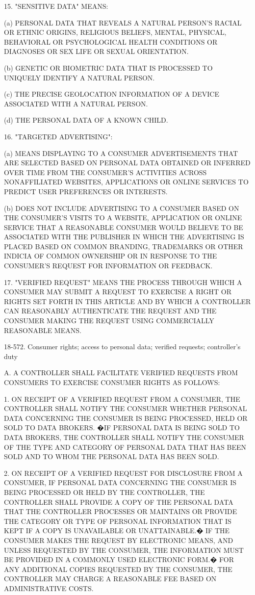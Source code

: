 15. "SENSITIVE DATA" MEANS:

(a) PERSONAL DATA THAT REVEALS A NATURAL PERSON'S RACIAL OR ETHNIC ORIGINS, RELIGIOUS BELIEFS, MENTAL, PHYSICAL, BEHAVIORAL OR PSYCHOLOGICAL HEALTH CONDITIONS OR DIAGNOSES OR SEX LIFE OR SEXUAL ORIENTATION.

(b) GENETIC OR BIOMETRIC DATA THAT IS PROCESSED TO UNIQUELY IDENTIFY A NATURAL PERSON.

(c) THE PRECISE GEOLOCATION INFORMATION OF A DEVICE ASSOCIATED WITH A NATURAL PERSON.

(d) THE PERSONAL DATA OF A KNOWN CHILD.

16. "TARGETED ADVERTISING":

(a) MEANS DISPLAYING TO A CONSUMER ADVERTISEMENTS THAT ARE SELECTED BASED ON PERSONAL DATA OBTAINED OR INFERRED OVER TIME FROM THE CONSUMER'S ACTIVITIES ACROSS NONAFFILIATED WEBSITES, APPLICATIONS OR ONLINE SERVICES TO PREDICT USER PREFERENCES OR INTERESTS.

(b) DOES NOT INCLUDE ADVERTISING TO A CONSUMER BASED ON THE CONSUMER'S VISITS TO A WEBSITE, APPLICATION OR ONLINE SERVICE THAT A REASONABLE CONSUMER WOULD BELIEVE TO BE ASSOCIATED WITH THE PUBLISHER IN WHICH THE ADVERTISING IS PLACED BASED ON COMMON BRANDING, TRADEMARKS OR OTHER INDICIA OF COMMON OWNERSHIP OR IN RESPONSE TO THE CONSUMER'S REQUEST FOR INFORMATION OR FEEDBACK.

17. "VERIFIED REQUEST" MEANS THE PROCESS THROUGH WHICH A CONSUMER MAY SUBMIT A REQUEST TO EXERCISE A RIGHT OR RIGHTS SET FORTH IN THIS ARTICLE AND BY WHICH A CONTROLLER CAN REASONABLY AUTHENTICATE THE REQUEST AND THE CONSUMER MAKING THE REQUEST USING COMMERCIALLY REASONABLE MEANS.

18-572. Consumer rights; access to personal data; verified requests; controller's duty

A. A CONTROLLER SHALL FACILITATE VERIFIED REQUESTS FROM CONSUMERS TO EXERCISE CONSUMER RIGHTS AS FOLLOWS:

1. ON RECEIPT OF A VERIFIED REQUEST FROM A CONSUMER, THE CONTROLLER SHALL NOTIFY THE CONSUMER WHETHER PERSONAL DATA CONCERNING THE CONSUMER IS BEING PROCESSED, HELD OR SOLD TO DATA BROKERS. �IF PERSONAL DATA IS BEING SOLD TO DATA BROKERS, THE CONTROLLER SHALL NOTIFY THE CONSUMER OF THE TYPE AND CATEGORY OF PERSONAL DATA THAT HAS BEEN SOLD AND TO WHOM THE PERSONAL DATA HAS BEEN SOLD.

2. ON RECEIPT OF A VERIFIED REQUEST FOR DISCLOSURE FROM A CONSUMER, IF PERSONAL DATA CONCERNING THE CONSUMER IS BEING PROCESSED OR HELD BY THE CONTROLLER, THE CONTROLLER SHALL PROVIDE A COPY OF THE PERSONAL DATA THAT THE CONTROLLER PROCESSES OR MAINTAINS OR PROVIDE THE CATEGORY OR TYPE OF PERSONAL INFORMATION THAT IS KEPT IF A COPY IS UNAVAILABLE OR UNATTAINABLE.� IF THE CONSUMER MAKES THE REQUEST BY ELECTRONIC MEANS, AND UNLESS REQUESTED BY THE CONSUMER, THE INFORMATION MUST BE PROVIDED IN A COMMONLY USED ELECTRONIC FORM.� FOR ANY ADDITIONAL COPIES REQUESTED BY THE CONSUMER, THE CONTROLLER MAY CHARGE A REASONABLE FEE BASED ON ADMINISTRATIVE COSTS.

